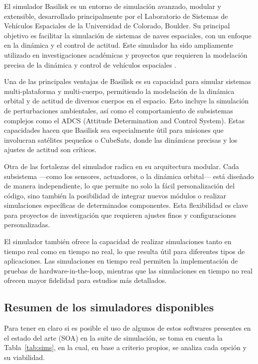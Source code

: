 El simulador Basilisk es un entorno de simulación avanzado, modular y extensible, desarrollado principalmente por el Laboratorio de Sistemas de Vehículos Espaciales de la Universidad de Colorado, Boulder. Su principal objetivo es facilitar la simulación de sistemas de naves espaciales, con un enfoque en la dinámica y el control de actitud. Este simulador ha sido ampliamente utilizado en investigaciones académicas y proyectos que requieren la modelación precisa de la dinámica y control de vehículos espaciales \cite{ref36}.

Una de las principales ventajas de Basilisk es su capacidad para simular sistemas multi-plataforma y multi-cuerpo, permitiendo la modelación de la dinámica orbital y de actitud de diversos cuerpos en el espacio. Esto incluye la simulación de perturbaciones ambientales, así como el comportamiento de subsistemas complejos como el ADCS (Attitude Determination and Control System). Estas capacidades hacen que Basilisk sea especialmente útil para misiones que involucran satélites pequeños o CubeSats, donde las dinámicas precisas y los ajustes de actitud son críticos.

Otra de las fortalezas del simulador radica en su arquitectura modular. Cada subsistema —como los sensores, actuadores, o la dinámica orbital— está diseñado de manera independiente, lo que permite no solo la fácil personalización del código, sino también la posibilidad de integrar nuevos módulos o realizar simulaciones específicas de determinados componentes. Esta flexibilidad es clave para proyectos de investigación que requieren ajustes finos y configuraciones personalizadas.

El simulador también ofrece la capacidad de realizar simulaciones tanto en tiempo real como en tiempo no real, lo que resulta útil para diferentes tipos de aplicaciones. Las simulaciones en tiempo real permiten la implementación de pruebas de hardware-in-the-loop, mientras que las simulaciones en tiempo no real ofrecen mayor fidelidad para estudios más detallados.

\subsection{Resumen de los simuladores disponibles}

Para tener en claro si es posible el uso de algunos de estos softwares presentes en el estado del arte (SOA) en la suite de simulación, se toma en cuenta la Tabla~\ref{tab:sims}, en la cual, en base a criterio propios, se analiza cada opción y su viabilidad.


